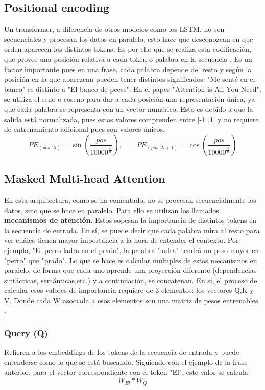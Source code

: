 \documentclass[11pt]{book}
\theoremstyle{plain}
\theoremstyle{definition}
\begin{document}
\subsection{Positional encoding}
Un transformer, a diferencia de otros modelos como los LSTM, no son secuenciales y procesan los datos en paralelo, esto hace que desconozcan en que orden aparecen los distintos tokens. Es por ello que se realiza esta codificación, que provee una posición relativa a cada token o palabra en la secuencia \parencite{phillips2019positional}. Es un factor importante pues en una frase, cada palabra depende del resto y según la posición en la que aparezcan pueden tener distintos significados: "Me senté en el banco" es distinto a "El banco de peces". En el paper "Attention is All You Need", se utiliza el seno o coseno para dar a cada posición una representación única, ya que cada palabra se representa con un vector numérico. Esto es debido a que la salida está normalizada, pues estos valores comprenden entre [-1 ,1] y no requiere de entrenamiento adicional pues son valores únicos. 
    \[
    PE_{(pos, 2i)} = \sin\!\left(\frac{pos}{10000^{\tfrac{2i}{d}}}\right), 
    \qquad
    PE_{(pos, 2i+1)} = \cos\!\left(\frac{pos}{10000^{\tfrac{2i}{d}}}\right)
    \]
\subsection{Masked Multi-head Attention}\label{subsec:multihead}
En esta arquitectura, como se ha comentado, no se procesan secuencialmente los datos, sino que se hace en paralelo. Para ello se utilizan los llamados \textbf{mecanismos de atención}. Estos sopesan la importancia de distintos tokens en la secuencia de entrada. En sí, se puede decir que cada palabra mira al resto para ver cuáles tienen mayor importancia a la hora de entender el contexto. Por ejemplo, "El perro ladra en el prado", la palabra "ladra" tendrá un peso mayor en "perro" que "prado". Lo que se hace es calcular múltiples de estos mecanismos en paralelo, de forma que cada uno aprende una proyección diferente (dependencias sintácticas, semánticas,etc.) y a continuación, se concatenan. 
En sí, el proceso de calcular esos valores de importancia requiere de 3 elementos: los vectores Q,K y V. Donde cada W asociada a esos elementos son una matriz de pesos entrenables \parencite{analytics2020qkv}.

\subsubsection{Query (Q)}
Refieren a los embeddings de los tokens de la secuencia de entrada y puede entenderse como lo que se está buscando. Siguiendo con el ejemplo de la frase anterior, para el vector correspondiente con el token "El", este valor se calcula: \[W_{El} * W_{Q}\]
\end{document}
